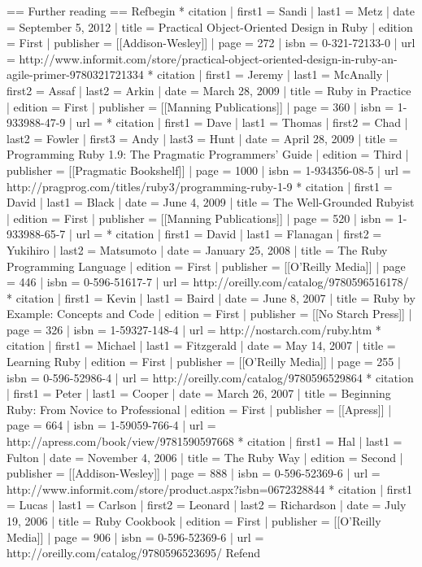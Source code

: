 == Further reading ==
{{Refbegin}}
* {{citation
| first1    = Sandi
| last1     = Metz
| date      = September 5, 2012
| title     = Practical Object-Oriented Design in Ruby
| edition   = First
| publisher = [[Addison-Wesley]]
| page      = 272
| isbn      = 0-321-72133-0
| url       = http://www.informit.com/store/practical-object-oriented-design-in-ruby-an-agile-primer-9780321721334
}}
* {{citation
| first1    = Jeremy
| last1     = McAnally
| first2    = Assaf
| last2     = Arkin
| date      = March 28, 2009
| title     = Ruby in Practice
| edition   = First
| publisher = [[Manning Publications]]
| page      = 360
| isbn      = 1-933988-47-9
| url       =
}}
* {{citation
| first1    = Dave
| last1     = Thomas
| first2    = Chad
| last2     = Fowler
| first3    = Andy
| last3     = Hunt
| date      = April 28, 2009
| title     = Programming Ruby 1.9: The Pragmatic Programmers' Guide
| edition   = Third
| publisher = [[Pragmatic Bookshelf]]
| page      = 1000
| isbn      = 1-934356-08-5
| url       = http://pragprog.com/titles/ruby3/programming-ruby-1-9
}}
* {{citation
| first1    = David
| last1     = Black
| date      = June 4, 2009
| title     = The Well-Grounded Rubyist
| edition   = First
| publisher = [[Manning Publications]]
| page      = 520
| isbn      = 1-933988-65-7
| url       =
}}
* {{citation
| first1    = David
| last1     = Flanagan
| first2    = Yukihiro
| last2     = Matsumoto
| date      = January 25, 2008
| title     = The Ruby Programming Language
| edition   = First
| publisher = [[O'Reilly Media]]
| page      = 446
| isbn      = 0-596-51617-7
| url       = http://oreilly.com/catalog/9780596516178/
}}
* {{citation
| first1    = Kevin
| last1     = Baird
| date      = June 8, 2007
| title     = Ruby by Example: Concepts and Code
| edition   = First
| publisher = [[No Starch Press]]
| page      = 326
| isbn      = 1-59327-148-4
| url       = http://nostarch.com/ruby.htm
}}
* {{citation
| first1    = Michael
| last1     = Fitzgerald
| date      = May 14, 2007
| title     = Learning Ruby
| edition   = First
| publisher = [[O'Reilly Media]]
| page      = 255
| isbn      = 0-596-52986-4
| url       = http://oreilly.com/catalog/9780596529864
}}
* {{citation
| first1    = Peter
| last1     = Cooper
| date      = March 26, 2007
| title     = Beginning Ruby: From Novice to Professional
| edition   = First
| publisher = [[Apress]]
| page      = 664
| isbn      = 1-59059-766-4
| url       = http://apress.com/book/view/9781590597668
}}
* {{citation
| first1    = Hal
| last1     = Fulton
| date      = November 4, 2006
| title     = The Ruby Way
| edition   = Second
| publisher = [[Addison-Wesley]]
| page      = 888
| isbn      = 0-596-52369-6
| url       = http://www.informit.com/store/product.aspx?isbn=0672328844
}}
* {{citation
| first1    = Lucas
| last1     = Carlson
| first2    = Leonard
| last2     = Richardson
| date      = July 19, 2006
| title     = Ruby Cookbook
| edition   = First
| publisher = [[O'Reilly Media]]
| page      = 906
| isbn      = 0-596-52369-6
| url       = http://oreilly.com/catalog/9780596523695/
}}
{{Refend}}

